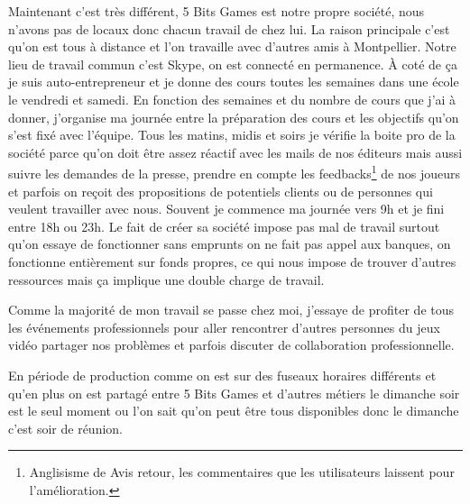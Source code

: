 \documentclass[12pt, a4paper]{report} %
\begin{document}
{Maintenant c'est très différent, 5 Bits Games est notre propre société, nous n’avons pas de locaux donc chacun travail de chez lui. La raison principale c'est qu'on est tous à distance  et l'on travaille avec d'autres amis à Montpellier. Notre lieu de travail commun c'est Skype, on est connecté en permanence. \`{A} coté de ça je suis auto-entrepreneur et je donne des cours toutes les semaines dans une école le vendredi et samedi.
En fonction des semaines et du nombre de cours que j'ai à donner, j'organise ma journée entre la préparation des cours et les objectifs qu'on s'est fixé avec l'équipe. Tous les matins, midis et soirs je vérifie la boite pro de la société parce qu'on doit être assez réactif avec les mails de nos éditeurs mais aussi suivre les demandes de la presse, prendre en compte les feedbacks\footnote{Anglisisme de Avis retour, les commentaires que les utilisateurs laissent pour l'amélioration.} de nos joueurs et parfois on reçoit des propositions de potentiels clients ou de personnes qui veulent travailler avec nous. Souvent je commence ma journée vers 9h et je fini entre 18h ou 23h. Le fait de créer sa société  impose pas mal de travail surtout qu'on essaye de fonctionner sans emprunts on ne fait pas appel aux banques, on fonctionne entièrement sur fonds propres, ce qui nous impose de trouver d'autres ressources  mais ça implique une double charge de travail. 

Comme la majorité de mon travail se passe chez moi, j'essaye de profiter de tous les événements professionnels pour aller rencontrer d'autres personnes du jeux vidéo partager nos problèmes et parfois discuter de collaboration professionnelle.

En période de production comme on est sur des fuseaux horaires différents et qu'en plus on est partagé entre 5 Bits Games et d'autres métiers  le dimanche soir est le seul moment ou l'on sait qu'on peut être tous disponibles donc le dimanche c'est soir de réunion.}
\end{document}

